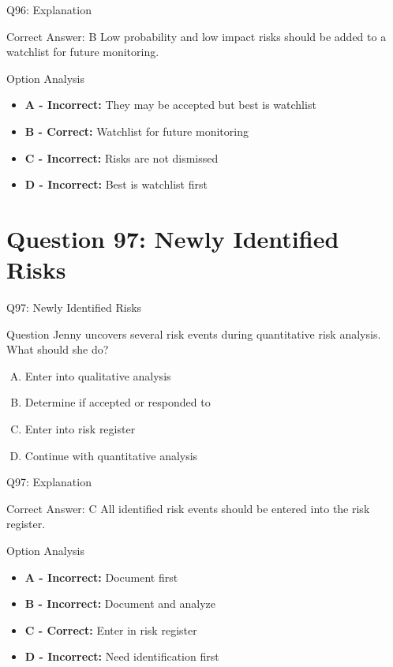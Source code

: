 \documentclass{beamer}
\begin{document}
	\begin{frame}{Q96: Explanation}
		\begin{block}{Correct Answer: B}
			Low probability and low impact risks should be added to a watchlist for future monitoring.
		\end{block}
		\begin{block}{Option Analysis}
			\begin{itemize}
				\item \textbf{A - Incorrect:} They may be accepted but best is watchlist
				\item \textbf{B - Correct:} Watchlist for future monitoring
				\item \textbf{C - Incorrect:} Risks are not dismissed
				\item \textbf{D - Incorrect:} Best is watchlist first
			\end{itemize}
		\end{block}
	\end{frame}
	
	\section{Question 97: Newly Identified Risks}
	
	\begin{frame}{Q97: Newly Identified Risks}
		\begin{block}{Question}
			Jenny uncovers several risk events during quantitative risk analysis. What should she do?
		\end{block}
		\begin{enumerate}[(A)]
			\item Enter into qualitative analysis
			\item Determine if accepted or responded to
			\item Enter into risk register
			\item Continue with quantitative analysis
		\end{enumerate}
	\end{frame}
	
	\begin{frame}{Q97: Explanation}
		\begin{block}{Correct Answer: C}
			All identified risk events should be entered into the risk register.
		\end{block}
		\begin{block}{Option Analysis}
			\begin{itemize}
				\item \textbf{A - Incorrect:} Document first
				\item \textbf{B - Incorrect:} Document and analyze
				\item \textbf{C - Correct:} Enter in risk register
				\item \textbf{D - Incorrect:} Need identification first
			\end{itemize}
		\end{block}
	\end{frame}
	
\end{document}
